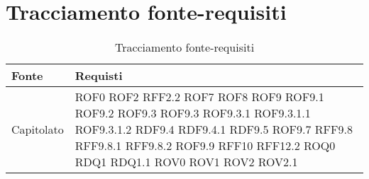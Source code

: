 \documentclass[../AnalisideiRequisiti.tex]{subfiles}
\begin{document}
	\section{Tracciamento fonte-requisiti}
	\begin{longtable}{| p{4cm} | p{4cm} |}
		\caption{Tracciamento fonte-requisiti} \\
		\hline
		\textbf{Fonte} & \textbf{Requisti} \\
			\hline
		\endhead
		\newline Capitolato & \newline ROF0 \newline ROF2 \newline RFF2.2 \newline ROF7 \newline ROF8 \newline ROF9 \newline ROF9.1 \newline ROF9.2 \newline ROF9.3 \newline ROF9.3 \newline ROF9.3.1 \newline ROF9.3.1.1 \newline ROF9.3.1.2 \newline RDF9.4 \newline RDF9.4.1 \newline RDF9.5 \newline ROF9.7 \newline RFF9.8 \newline RFF9.8.1 \newline RFF9.8.2 \newline ROF9.9 \newline RFF10 \newline RFF12.2 \newline ROQ0 \newline RDQ1 \newline RDQ1.1 \newline ROV0 \newline ROV1 \newline ROV2 \newline ROV2.1 \\[1em]
	\hline	

\end{longtable}
\end{document}
